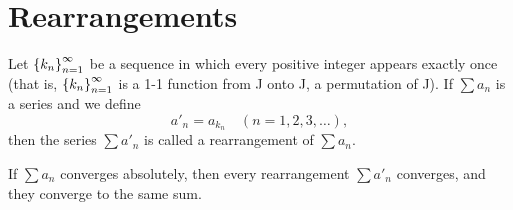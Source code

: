 \section{Rearrangements}
\label{sec:chap3:rearrangements}

\begin{definition}[Rearrangement] %
  \label{def:chap3:rearrangement}
  Let $\left\{ k_n \right\}_{n=1}^\infty$ be a sequence in which every positive integer
  appears exactly once (that is, $\left\{ k_n \right\}_{n=1}^\infty$ is a 1-1 function
  from J onto J, a permutation of J). If $\sum a_n$ is a series and we define
  \[ a'_n = a_{k_n} \quad (n = 1, 2, 3, \dots), \]
  then the series $\sum a'_n$ is called a rearrangement of $\sum a_n$.
\end{definition}


\begin{theorem} %
  \label{thm:chap3:rearrangement_abs_conv}
  If $\sum a_n$ converges absolutely, then every rearrangement $\sum
  a'_n$ converges, and they converge to the same sum.
\end{theorem}

